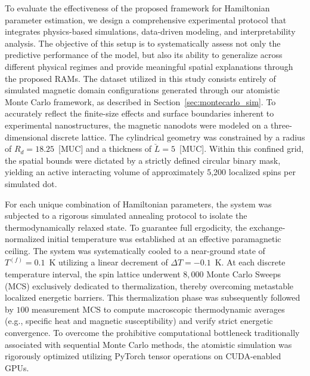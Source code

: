 \documentclass[final,5p,times,twocolumn]{elsarticle}
\begin{document}
To evaluate the effectiveness of the proposed framework 
for Hamiltonian parameter estimation, we design a 
comprehensive experimental protocol that integrates 
physics-based simulations, data-driven modeling, and 
interpretability analysis. The objective of this setup 
is to systematically assess not only the predictive 
performance of the model, but also its ability to 
generalize across different physical regimes and provide 
meaningful spatial explanations through the proposed RAMs. 
The dataset utilized in this study consists entirely of 
simulated magnetic domain configurations generated through 
our atomistic Monte Carlo framework, as described in 
Section~\ref{sec:montecarlo_sim}. To accurately reflect 
the finite-size effects and surface boundaries inherent 
to experimental nanostructures, the magnetic nanodots 
were modeled on a three-dimensional discrete lattice. 
The cylindrical geometry was constrained by a radius of 
$R_d = 18.25$~[MUC] and a thickness of $\breve{L} = 5$~[MUC]. 
Within this confined grid, the spatial bounds were 
dictated by a strictly defined circular binary mask, 
yielding an active interacting volume of approximately 
5,200 localized spins per simulated dot.

For each unique combination of Hamiltonian parameters, 
the system was subjected to a rigorous simulated annealing 
protocol to isolate the thermodynamically relaxed state. 
To guarantee full ergodicity, the exchange-normalized 
initial temperature was established at an effective 
paramagnetic ceiling. The system was systematically 
cooled to a near-ground state of $T^{(f)} = 0.1$~K 
utilizing a linear decrement of $\Delta T = -0.1$~K. 
At each discrete temperature interval, the spin lattice 
underwent $8{,}000$ Monte Carlo Sweeps (MCS) exclusively 
dedicated to thermalization, thereby overcoming metastable 
localized energetic barriers. This thermalization phase 
was subsequently followed by $100$ measurement MCS to 
compute macroscopic thermodynamic averages (e.g., specific 
heat and magnetic susceptibility) and verify strict 
energetic convergence. To overcome the prohibitive 
computational bottleneck traditionally associated with 
sequential Monte Carlo methods, the atomistic simulation 
was rigorously optimized utilizing PyTorch tensor 
operations on CUDA-enabled GPUs.
\end{document}
